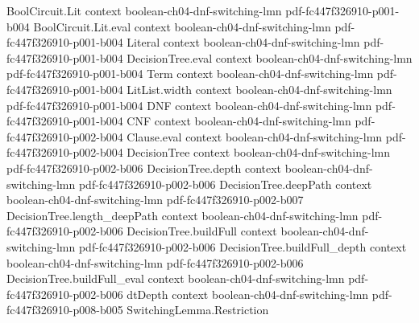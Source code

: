 \begin{theorem}
\label{LMN.normalform_one_step_cnf_replaceability}
\leanok
{}
\proofstep
  {BoolCircuit.Lit}
  {context}
  {boolean-ch04-dnf-switching-lmn}
  {pdf-fc447f326910-p001-b004}
\proofstep
  {BoolCircuit.Lit.eval}
  {context}
  {boolean-ch04-dnf-switching-lmn}
  {pdf-fc447f326910-p001-b004}
\proofstep
  {Literal}
  {context}
  {boolean-ch04-dnf-switching-lmn}
  {pdf-fc447f326910-p001-b004}
\proofstep
  {DecisionTree.eval}
  {context}
  {boolean-ch04-dnf-switching-lmn}
  {pdf-fc447f326910-p001-b004}
\proofstep
  {Term}
  {context}
  {boolean-ch04-dnf-switching-lmn}
  {pdf-fc447f326910-p001-b004}
\proofstep
  {LitList.width}
  {context}
  {boolean-ch04-dnf-switching-lmn}
  {pdf-fc447f326910-p001-b004}
\proofstep
  {DNF}
  {context}
  {boolean-ch04-dnf-switching-lmn}
  {pdf-fc447f326910-p001-b004}
\proofstep
  {CNF}
  {context}
  {boolean-ch04-dnf-switching-lmn}
  {pdf-fc447f326910-p002-b004}
\proofstep
  {Clause.eval}
  {context}
  {boolean-ch04-dnf-switching-lmn}
  {pdf-fc447f326910-p002-b004}
\proofstep
  {DecisionTree}
  {context}
  {boolean-ch04-dnf-switching-lmn}
  {pdf-fc447f326910-p002-b006}
\proofstep
  {DecisionTree.depth}
  {context}
  {boolean-ch04-dnf-switching-lmn}
  {pdf-fc447f326910-p002-b006}
\proofstep
  {DecisionTree.deepPath}
  {context}
  {boolean-ch04-dnf-switching-lmn}
  {pdf-fc447f326910-p002-b007}
\proofstep
  {DecisionTree.length_deepPath}
  {context}
  {boolean-ch04-dnf-switching-lmn}
  {pdf-fc447f326910-p002-b006}
\proofstep
  {DecisionTree.buildFull}
  {context}
  {boolean-ch04-dnf-switching-lmn}
  {pdf-fc447f326910-p002-b006}
\proofstep
  {DecisionTree.buildFull_depth}
  {context}
  {boolean-ch04-dnf-switching-lmn}
  {pdf-fc447f326910-p002-b006}
\proofstep
  {DecisionTree.buildFull_eval}
  {context}
  {boolean-ch04-dnf-switching-lmn}
  {pdf-fc447f326910-p002-b006}
\proofstep
  {dtDepth}
  {context}
  {boolean-ch04-dnf-switching-lmn}
  {pdf-fc447f326910-p008-b005}
\proofstep
  {SwitchingLemma.Restriction}

\end{theorem}
